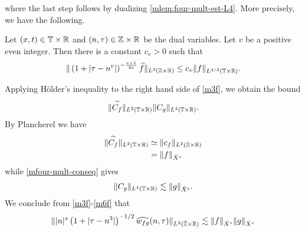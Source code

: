 %
where the last step follows by dualizing \cref{mlem:four-mult-est-L4}. More
precisely, we have the following.
\begin{corollary}
	\label{mcor:four-mult-est-L4}
	Let $(x, t) \in \mathbb{T} \times \mathbb{R} $ and $(n, \tau) \in \mathbb{Z} \times \mathbb{R}$ be 
	the dual variables. Let $v$ be a positive even integer. Then there is a 
	constant $c_v > 0$ such that
%
%
\begin{equation}
	\label{mfour-mult-est-L4*}
	\begin{split}
		\| \left( 1 + | \tau - n^v | 
		\right)^{-\frac{v+1}{4v}}
		\widehat{f}\|_{L^2(\mathbb{Z} \times \mathbb{R})} \le c_v \|f \|_{L^{4/3}( \mathbb{T} \times \mathbb{R})}.
	\end{split}
\end{equation}
%
%
\end{corollary}
%
Applying H\"{o}lder's inequality to the right hand side of
\eqref{m3f}, we obtain the bound
%
\begin{equation}
	\label{m4f}
	\begin{split}
		\|\overset{\sim}{C_f} \|_{L^2(\mathbb{T} \times \mathbb{R})} \|C_g \|_{L^4\left( \mathbb{T} 
		\times \mathbb{R} 
		\right)}. 
	\end{split}
\end{equation}
%
By Plancherel we have
%
%
\begin{equation}
	\label{m5f}
	\begin{split}
		\|\overset{\sim}{C_f} \|_{L^2(\mathbb{T} \times \mathbb{R})}
		& \simeq \|c_f\|_{L^2(\mathbb{Z} \times \mathbb{R})}
		\\
		& = \|f \|_{\dot{X}^s}
	\end{split}
\end{equation}
%
while \eqref{mfour-mult-conseq} gives
%
%
\begin{equation}
	\label{m6f}
	\begin{split}
		\|C_g \|_{L^4(\mathbb{T} \times \mathbb{R})} \lesssim \|g\|_{\dot{X}^s}.
	\end{split}
\end{equation}
%
%
We conclude from \eqref{m3f}-\eqref{m6f} that
%
%
\begin{equation*}
	\begin{split}
		\| |n|^s \left( 1 + | \tau - n^3 | \right)^{-1/2} \widehat{w_{fg}}(n, \tau) 
		 \|_{L^2(\dot{\mathbb{Z}} \times \mathbb{R})}
		 \lesssim \|f\|_{\dot{X}^s} \|g\|_{\dot{X}^s}
	\end{split}
\end{equation*}
%
%
